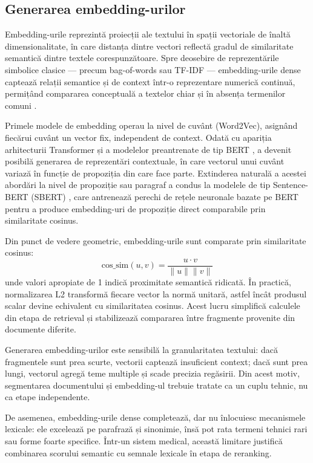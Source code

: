 \documentclass[12pt, a4paper, oneside, romanian]{teza-upb}
\begin{document}
\subsection{Generarea embedding-urilor}

Embedding-urile reprezintă proiecții ale textului în spații vectoriale de înaltă dimensionalitate, în care distanța dintre vectori reflectă gradul de similaritate semantică dintre textele corespunzătoare. Spre deosebire de reprezentările simbolice clasice — precum bag-of-words sau TF-IDF — embedding-urile dense captează relații semantice și de context 
într-o reprezentare numerică continuă, permițând compararea conceptuală a textelor chiar și în absența termenilor comuni \cite{mikolov2013word2vec}.

Primele modele de embedding operau la nivel de cuvânt (Word2Vec), asignând fiecărui cuvânt un vector fix, independent de context. Odată cu apariția arhitecturii Transformer și a modelelor preantrenate de tip BERT \cite{devlin2018bert}, a devenit posibilă generarea de reprezentări contextuale, în care vectorul unui cuvânt variază în funcție de propoziția din care face parte. Extinderea naturală a acestei abordări la nivel de propoziție sau paragraf a condus la modelele de tip Sentence-BERT (SBERT) \cite{reimers2019sbert}, care antrenează perechi de rețele neuronale bazate pe BERT pentru a produce embedding-uri de propoziție direct comparabile prin similaritate cosinus.

Din punct de vedere geometric, embedding-urile sunt comparate prin similaritate cosinus:
\[
\mathrm{cos\_sim}(u,v)=\frac{u\cdot v}{\|u\|\|v\|}
\]
unde valori apropiate de 1 indică proximitate semantică ridicată. În practică, normalizarea L2 transformă fiecare vector la normă unitară, astfel încât produsul scalar devine echivalent cu similaritatea cosinus. Acest lucru simplifică calculele din etapa de retrieval și stabilizează compararea între fragmente provenite din documente diferite.

Generarea embedding-urilor este sensibilă la granularitatea textului: dacă fragmentele sunt prea scurte, vectorii captează insuficient context; dacă sunt prea lungi, vectorul agregă teme multiple și scade precizia regăsirii. Din acest motiv, segmentarea documentului și embedding-ul trebuie tratate ca un cuplu tehnic, nu ca etape independente.

De asemenea, embedding-urile dense completează, dar nu înlocuiesc mecanismele lexicale: ele excelează pe parafrază și sinonimie, însă pot rata termeni tehnici rari sau forme foarte specifice. Într-un sistem medical, această limitare justifică combinarea scorului semantic cu semnale lexicale în etapa de reranking.
\end{document}
